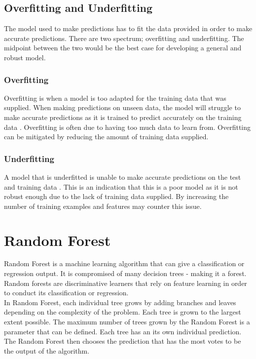 \subsection{Overfitting and Underfitting}
The model used to make predictions has to fit the data provided in order to make accurate predictions. There are two spectrum; overfitting and underfitting. The midpoint between the two would be the best case for developing a general and robust model. 
\subsubsection{Overfitting}
Overfitting is when a model is too adapted for the training data that was supplied. When making predictions on unseen data, the model will struggle to make accurate predictions as it is trained to predict accurately on the training data \cite{ref:ml_1}. Overfitting is often due to having too much data to learn from. Overfitting can be mitigated by reducing the amount of training data supplied. 

\subsubsection{Underfitting}
A model that is underfitted is unable to make accurate predictions on the test and training data \cite{ref:ml_1}. This is an indication that this is a poor model as it is not robust enough due to the lack of training data supplied. By increasing the number of training examples and features may counter this issue.   
	
\section{Random Forest}
Random Forest is a machine learning algorithm that can give a classification or regression output. It is compromised of many decision trees - making it a forest.  Random forests are discriminative learners that rely on feature learning in order to conduct its classification or regression. 
\\[1\baselineskip]
In Random Forest, each individual tree grows by adding branches and leaves depending on the complexity of the problem. Each tree is grown to the largest extent possible. The maximum number of trees grown by the Random Forest is a parameter that can be defined. Each tree has an its own individual prediction. The Random Forest then chooses the prediction that has the most votes to be the output of the algorithm. 

